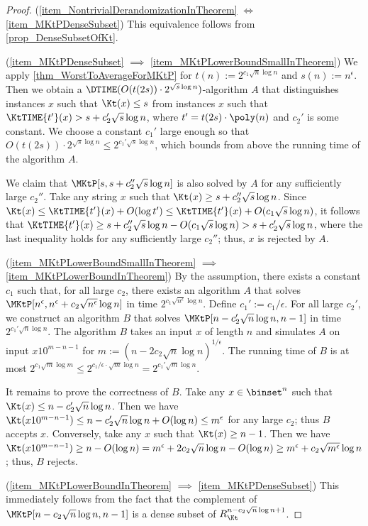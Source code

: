 \documentclass{toc}
\begin{document}
\begin{proof}
  (\cref{item_NontrivialDerandomizationInTheorem} $\Longleftrightarrow$ \cref{item_MKtPDenseSubset})
  This equivalence follows from \cref{prop_DenseSubsetOfKt}.

  (\cref{item_MKtPDenseSubset} $\implies$ \cref{item_MKtPLowerBoundSmallInTheorem})
  We apply \cref{thm_WorstToAverageForMKtP} for $t(n) := 2^{c_1 \sqrt{n} \log n}$ and $s(n) := n^\epsilon$.
  Then we obtain a $\DTIME(O(t(2 s)) \cdot 2^{\sqrt{s} \log n})$-algorithm $A$ that distinguishes
  \Yes instances $x$ such that $\Kt(x) \le s$
  from \No instances $x$ such that $\KtTIME{t'}(x) > s + c_2' \sqrt{s} \log n$, where $t' = t(2s) \cdot \poly(n)$ and $c_2'$ is some constant.
  We choose a constant $c_1'$ large enough so that
  $O(t(2 s)) \cdot 2^{\sqrt{s} \log n} \le 2^{c_1' \sqrt{s} \log n}$, which bounds from above the running time of the algorithm $A$.

  We claim that $\MKtP[s, s + c_2'' \sqrt{s} \log n]$ is also solved by $A$ for any sufficiently large $c_2''$.
  Take any string $x$ such that $\Kt(x) \ge s + c_2'' \sqrt{s} \log n$.
  Since $\Kt(x) \le \KtTIME{t'}(x) + O(\log t') \le \KtTIME{t'}(x) + O(c_1 \sqrt{s} \log n)$,
  it follows that $\KtTIME{t'}(x) \ge s + c_2'' \sqrt{s} \log n - O(c_1 \sqrt{s} \log n) > s + c_2' \sqrt{s} \log n$,
  where the last inequality holds for any sufficiently large $c_2''$; thus, $x$ is rejected by $A$.

  (\cref{item_MKtPLowerBoundSmallInTheorem} $\implies$ \cref{item_MKtPLowerBoundInTheorem})
  By the assumption, there exists a constant $c_1$ such that, for all large $c_2$,
  there exists an algorithm $A$ that solves $\MKtP[n^\epsilon, n^\epsilon +  c_2 \sqrt{n^\epsilon} \log n]$ in time $2^{c_1 \sqrt{n^\epsilon} \log n}$.
  Define $c_1' := c_1 / \epsilon$.
  For all large $c_2'$,
  we construct an algorithm $B$ that solves $\MKtP[n - c_2' \sqrt{n} \log n, n - 1]$ in time $2^{c_1' \sqrt{n} \log n}$.
  The algorithm $B$ takes an input $x$ of length $n$ and simulates $A$ on input $x 1 0^{m - n - 1}$ for $m := (n - 2 c_2 \sqrt{n} \log n)^{1/\epsilon}$.
  The running time of $B$ is at most $2^{c_1 \sqrt{m} \log m} \le 2^{c_1 / \epsilon \cdot \sqrt{m} \log n} = 2^{c_1' \sqrt{m} \log n}$.

  It remains to prove the correctness of $B$.
  Take any $x \in \binset^n$ such that $\Kt(x) \le n - c_2' \sqrt{n} \log n$.
  Then we have
  $\Kt(x10^{m-n-1}) \le n - c_2' \sqrt{n} \log n + O(\log n) \le m^\epsilon$ for any large $c_2$; thus $B$ accepts $x$.
  Conversely, take any $x$ such that $\Kt(x) \ge n - 1$.
  Then we have $\Kt(x10^{m-n-1}) \ge n - O(\log n) = m^{\epsilon} + 2 c_2 \sqrt{n} \log n - O(\log n) \ge m^\epsilon + c_2 \sqrt{m^\epsilon} \log n$;
  thus, $B$ rejects.

  (\cref{item_MKtPLowerBoundInTheorem} $\implies$ \cref{item_MKtPDenseSubset})
  This immediately follows from the fact that
  the complement of $\MKtP[n - c_2 \sqrt{n} \log n, n - 1]$ is a dense subset of $R_\Kt^{n - c_2 \sqrt{n} \log n + 1}$.
\end{proof}
\end{document}
